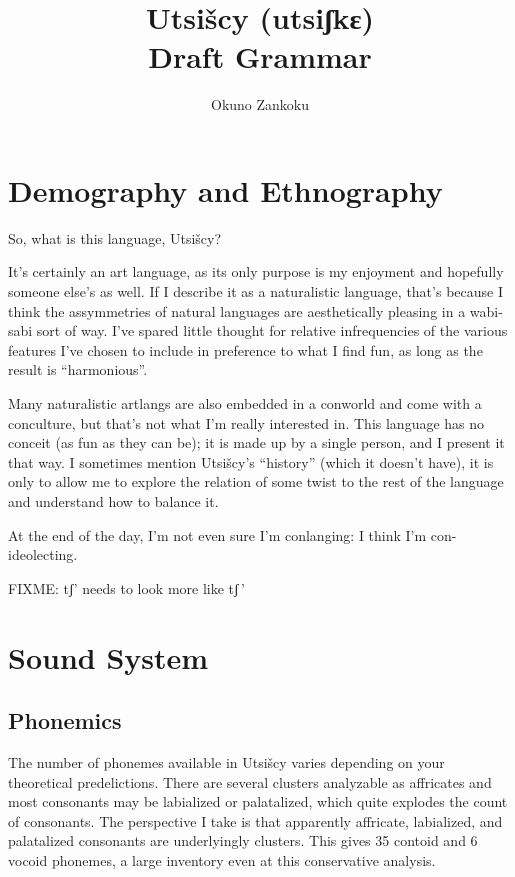 \documentclass[12pt]{book} %
\title{Utsišcy (utsiʃkɛ) \\ {\Large Draft Grammar}}
\author{Okuno Zankoku}
\begin{document}
\maketitle

\chapter{Demography and Ethnography}
So, what is this language, Utsišcy?

It's certainly an art language, as its only purpose is my enjoyment and hopefully someone else's as well.
If I describe it as a naturalistic language, that's because I think the assymmetries of natural languages are aesthetically pleasing in a wabi-sabi sort of way.
I've spared little thought for relative infrequencies of the various features I've chosen to include in preference to what I find fun, as long as the result is ``harmonious''.

Many naturalistic artlangs are also embedded in a conworld and come with a conculture, but that's not what I'm really interested in.
This language has no conceit (as fun as they can be); it is made up by a single person, and I present it that way.
I sometimes mention Utsišcy's ``history'' (which it doesn't have), it is only to allow me to explore the relation of some twist to the rest of the language and understand how to balance it.

At the end of the day, I'm not even sure I'm conlanging: I think I'm con-ideolecting.


FIXME: tʃ' needs to look more like tʃ\,'


\chapter{Sound System}

\section{Phonemics}

The number of phonemes available in Utsišcy varies depending on your theoretical predelictions.
There are several clusters analyzable as affricates and most consonants may be labialized or palatalized, which quite explodes the count of consonants.
The perspective I take is that apparently affricate, labialized, and palatalized consonants are underlyingly clusters.
This gives 35 contoid and 6 vocoid phonemes, a large inventory even at this conservative analysis.
\end{document}
